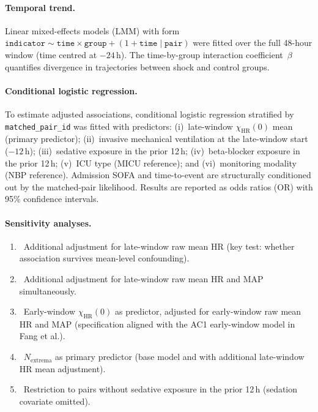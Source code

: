 \documentclass[12pt,a4paper]{article}
\begin{document}
\paragraph{Temporal trend.}
Linear mixed-effects models (LMM) with form
$\texttt{indicator} \sim \texttt{time} \times \texttt{group}
+ (1 + \texttt{time} \mid \texttt{pair})$
were fitted over the full 48-hour window (time centred at $-24$\,h).
The time-by-group interaction coefficient~$\beta$ quantifies divergence
in trajectories between shock and control groups.

\paragraph{Conditional logistic regression.}
To estimate adjusted associations, conditional logistic regression stratified
by \texttt{matched\_pair\_id} was fitted with predictors:
(i)~late-window $\chi_{\text{HR}}(0)$ mean (primary predictor);
(ii)~invasive mechanical ventilation at the late-window start ($-12$\,h);
(iii)~sedative exposure in the prior 12\,h;
(iv)~beta-blocker exposure in the prior 12\,h;
(v)~ICU type (MICU reference); and
(vi)~monitoring modality (NBP reference).
Admission SOFA and time-to-event are structurally conditioned out by the
matched-pair likelihood.
Results are reported as odds ratios (OR) with 95\% confidence intervals.

\paragraph{Sensitivity analyses.}
\begin{enumerate}
  \item[\textbf{S1}]~Additional adjustment for late-window raw mean HR
    (key test: whether association survives mean-level confounding).
  \item[\textbf{S2}]~Additional adjustment for late-window raw mean HR
    and MAP simultaneously.
  \item[\textbf{S3}]~Early-window $\chi_{\text{HR}}(0)$ as predictor,
    adjusted for early-window raw mean HR and MAP
    (specification aligned with the AC1 early-window model in Fang et al.).
  \item[\textbf{S4}]~$N_{\text{extrema}}$ as primary predictor (base model
    and with additional late-window HR mean adjustment).
  \item[\textbf{S5}]~Restriction to pairs without sedative exposure in the
    prior 12\,h (sedation covariate omitted).
\end{enumerate}
\end{document}
